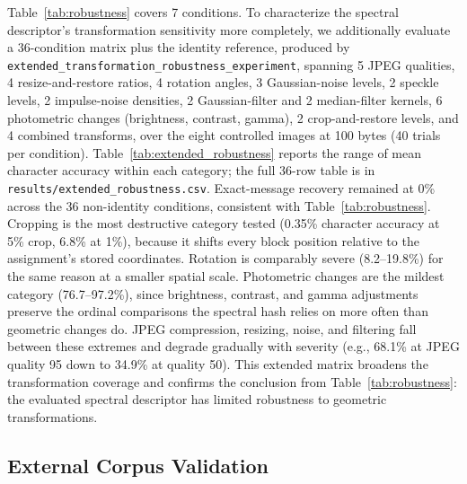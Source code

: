 \documentclass[preprint,12pt]{elsarticle}
\theoremstyle{plain}
\begin{document}
Table~\ref{tab:robustness} covers 7 conditions. To characterize the spectral
descriptor's transformation sensitivity more completely, we additionally
evaluate a 36-condition matrix plus the identity reference, produced by
\texttt{extended\_transformation\_robustness\_experiment}, spanning 5 JPEG
qualities, 4 resize-and-restore ratios, 4 rotation angles, 3 Gaussian-noise
levels, 2 speckle levels, 2 impulse-noise densities, 2 Gaussian-filter and 2
median-filter kernels, 6 photometric changes (brightness, contrast, gamma),
2 crop-and-restore levels, and 4 combined transforms, over the eight
controlled images at 100 bytes (40 trials per condition). Table~\ref{tab:extended_robustness}
reports the range of mean character accuracy within each category; the full
36-row table is in \texttt{results/extended\_robustness.csv}. Exact-message recovery remained at 0\% across the 36 non-identity
conditions, consistent with
Table~\ref{tab:robustness}. Cropping is the most destructive category tested
(0.35\% character accuracy at 5\% crop, 6.8\% at 1\%), because it shifts
every block position relative to the assignment's stored coordinates.
Rotation is comparably severe (8.2--19.8\%) for the same reason at a smaller
spatial scale. Photometric changes are the mildest category (76.7--97.2\%),
since brightness, contrast, and gamma adjustments preserve the ordinal
comparisons the spectral hash relies on more often than geometric changes
do. JPEG compression, resizing, noise, and filtering fall between these
extremes and degrade gradually with severity (e.g., 68.1\% at JPEG quality 95
down to 34.9\% at quality 50). This extended matrix broadens the
transformation coverage and confirms the conclusion from Table~\ref{tab:robustness}:
the evaluated spectral descriptor has limited robustness to geometric transformations.

\begin{table}[!t]
\centering
\caption{Extended Transformation Matrix: Character Accuracy Range by Category (100 Bytes, 40 Trials per Condition)}
\label{tab:extended_robustness}

\end{table}

\subsection{External Corpus Validation}
\end{document}
